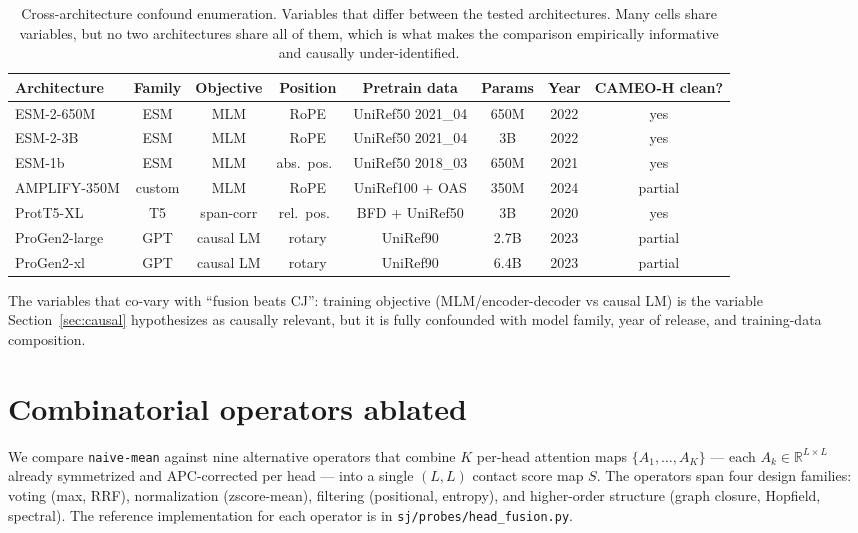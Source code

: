 \documentclass{article}
\begin{document}
\begin{table}[h]
\centering
\footnotesize
\caption{Cross-architecture confound enumeration. Variables that differ
between the tested architectures. Many cells share variables, but no two
architectures share all of them, which is what makes the comparison
empirically informative and causally under-identified.}
\label{tab:confounds}
\begin{tabular}{lccccccc}
\toprule
Architecture & Family & Objective & Position & Pretrain data & Params & Year & CAMEO-H clean? \\
\midrule
ESM-2-650M   & ESM    & MLM       & RoPE     & UniRef50 2021\_04 & 650M  & 2022 & yes \\
ESM-2-3B     & ESM    & MLM       & RoPE     & UniRef50 2021\_04 & 3B    & 2022 & yes \\
ESM-1b       & ESM    & MLM       & abs.\ pos.\ & UniRef50 2018\_03 & 650M  & 2021 & yes \\
AMPLIFY-350M & custom & MLM       & RoPE     & UniRef100 + OAS   & 350M  & 2024 & partial \\
ProtT5-XL    & T5     & span-corr & rel.\ pos.\ & BFD + UniRef50   & 3B    & 2020 & yes \\
ProGen2-large& GPT    & causal LM & rotary   & UniRef90          & 2.7B  & 2023 & partial \\
ProGen2-xl   & GPT    & causal LM & rotary   & UniRef90          & 6.4B  & 2023 & partial \\
\bottomrule
\end{tabular}
\end{table}

The variables that co-vary with ``fusion beats CJ'': training objective
(MLM/encoder-decoder vs causal LM) is the variable Section~\ref{sec:causal}
hypothesizes as causally relevant, but it is fully confounded with model
family, year of release, and training-data composition.

\section{Combinatorial operators ablated}
\label{app:operators}

We compare \texttt{naive-mean} against nine alternative operators
that combine $K$ per-head attention maps
$\{A_1, \ldots, A_K\}$ --- each $A_k \in \mathbb{R}^{L \times L}$
already symmetrized and APC-corrected per head --- into a single
$(L, L)$ contact score map $S$. The operators span four design
families: voting (max, RRF), normalization
(zscore-mean), filtering (positional, entropy), and
higher-order structure (graph closure, Hopfield, spectral).
The reference implementation for each operator is in
\texttt{sj/probes/head\_fusion.py}.
\end{document}
